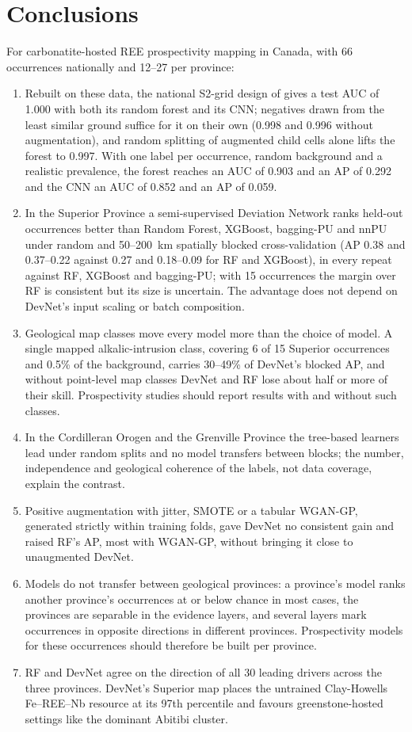 \documentclass[pdflatex,sn-apa]{sn-jnl}
\begin{document}
\section{Conclusions}\label{sec:conclusions}

For carbonatite-hosted REE prospectivity mapping in Canada, with 66 occurrences nationally and 12--27 per province:
\begin{enumerate}
\item Rebuilt on these data, the national S2-grid design of \citet{Parsa2024} gives a test AUC of 1.000 with both its random forest and its CNN; negatives drawn from the least similar ground suffice for it on their own (0.998 and 0.996 without augmentation), and random splitting of augmented child cells alone lifts the forest to 0.997. With one label per occurrence, random background and a realistic prevalence, the forest reaches an AUC of 0.903 and an AP of 0.292 and the CNN an AUC of 0.852 and an AP of 0.059.
\item In the Superior Province a semi-supervised Deviation Network ranks held-out occurrences better than Random Forest, XGBoost, bagging-PU and nnPU under random and 50--200~km spatially blocked cross-validation (AP 0.38 and 0.37--0.22 against 0.27 and 0.18--0.09 for RF and XGBoost), in every repeat against RF, XGBoost and bagging-PU; with 15 occurrences the margin over RF is consistent but its size is uncertain. The advantage does not depend on DevNet's input scaling or batch composition.
\item Geological map classes move every model more than the choice of model. A single mapped alkalic-intrusion class, covering 6 of 15 Superior occurrences and 0.5\% of the background, carries 30--49\% of DevNet's blocked AP, and without point-level map classes DevNet and RF lose about half or more of their skill. Prospectivity studies should report results with and without such classes.
\item In the Cordilleran Orogen and the Grenville Province the tree-based learners lead under random splits and no model transfers between blocks; the number, independence and geological coherence of the labels, not data coverage, explain the contrast.
\item Positive augmentation with jitter, SMOTE or a tabular WGAN-GP, generated strictly within training folds, gave DevNet no consistent gain and raised RF's AP, most with WGAN-GP, without bringing it close to unaugmented DevNet.
\item Models do not transfer between geological provinces: a province's model ranks another province's occurrences at or below chance in most cases, the provinces are separable in the evidence layers, and several layers mark occurrences in opposite directions in different provinces. Prospectivity models for these occurrences should therefore be built per province.
\item RF and DevNet agree on the direction of all 30 leading drivers across the three provinces. DevNet's Superior map places the untrained Clay-Howells Fe--REE--Nb resource at its 97th percentile and favours greenstone-hosted settings like the dominant Abitibi cluster.
\end{enumerate}
\end{document}
